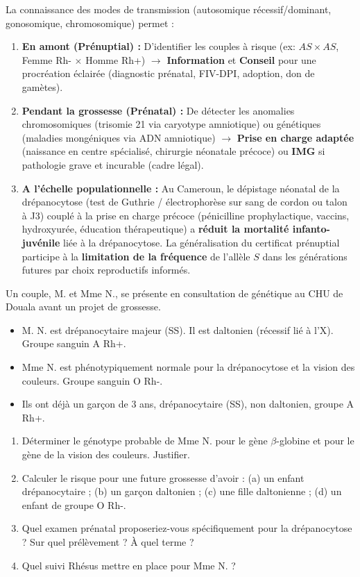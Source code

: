 \documentclass[11pt]{article}
\begin{document}
\begin{aretenir}
La connaissance des modes de transmission (autosomique récessif/dominant, gonosomique, chromosomique) permet :
\begin{enumerate}
    \item \textbf{En amont (Prénuptial) :} D'identifier les couples à risque (ex: $AS \times AS$, Femme Rh- $\times$ Homme Rh+) $\rightarrow$ \textbf{Information} et \textbf{Conseil} pour une procréation éclairée (diagnostic prénatal, FIV-DPI, adoption, don de gamètes).
    \item \textbf{Pendant la grossesse (Prénatal) :} De détecter les anomalies chromosomiques (trisomie 21 via caryotype amniotique) ou génétiques (maladies mongéniques via ADN amniotique) $\rightarrow$ \textbf{Prise en charge adaptée} (naissance en centre spécialisé, chirurgie néonatale précoce) ou \textbf{IMG} si pathologie grave et incurable (cadre légal).
    \item \textbf{A l'échelle populationnelle :} Au Cameroun, le dépistage néonatal de la drépanocytose (test de Guthrie / électrophorèse sur sang de cordon ou talon à J3) couplé à la prise en charge précoce (pénicilline prophylactique, vaccins, hydroxyurée, éducation thérapeutique) a \textbf{réduit la mortalité infanto-juvénile} liée à la drépanocytose. La généralisation du certificat prénuptial participe à la \textbf{limitation de la fréquence} de l'allèle $S$ dans les générations futures par choix reproductifs informés.
\end{enumerate}
\end{aretenir}

\begin{exercice}
Un couple, M. et Mme N., se présente en consultation de génétique au CHU de Douala avant un projet de grossesse.
\begin{itemize}
    \item M. N. est drépanocytaire majeur (SS). Il est daltonien (récessif lié à l'X). Groupe sanguin A Rh+.
    \item Mme N. est phénotypiquement normale pour la drépanocytose et la vision des couleurs. Groupe sanguin O Rh-.
    \item Ils ont déjà un garçon de 3 ans, drépanocytaire (SS), non daltonien, groupe A Rh+.
\end{itemize}
\begin{enumerate}
    \item Déterminer le génotype probable de Mme N. pour le gène $\beta$-globine et pour le gène de la vision des couleurs. Justifier.
    \item Calculer le risque pour une future grossesse d'avoir : (a) un enfant drépanocytaire ; (b) un garçon daltonien ; (c) une fille daltonienne ; (d) un enfant de groupe O Rh-.
    \item Quel examen prénatal proposeriez-vous spécifiquement pour la drépanocytose ? Sur quel prélèvement ? À quel terme ?
    \item Quel suivi Rhésus mettre en place pour Mme N. ?
\end{enumerate}
\end{exercice}
\end{document}
